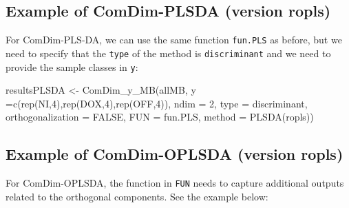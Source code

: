 \documentclass[
]{book}
\newenvironment{Shaded}{\begin{snugshade}}{\end{snugshade}}
\newcommand{\AttributeTok}[1]{\textcolor[rgb]{0.77,0.63,0.00}{#1}}
\newcommand{\ConstantTok}[1]{\textcolor[rgb]{0.00,0.00,0.00}{#1}}
\newcommand{\DecValTok}[1]{\textcolor[rgb]{0.00,0.00,0.81}{#1}}
\newcommand{\FunctionTok}[1]{\textcolor[rgb]{0.00,0.00,0.00}{#1}}
\newcommand{\NormalTok}[1]{#1}
\newcommand{\OtherTok}[1]{\textcolor[rgb]{0.56,0.35,0.01}{#1}}
\newcommand{\StringTok}[1]{\textcolor[rgb]{0.31,0.60,0.02}{#1}}
\begin{document}
\hypertarget{example-of-comdim-plsda-version-ropls}{%
\subsection{Example of ComDim-PLSDA (version ropls)}\label{example-of-comdim-plsda-version-ropls}}

For ComDim-PLS-DA, we can use the same function \texttt{fun.PLS} as before, but we need
to specify that the \texttt{type} of the method is \texttt{\textquotesingle{}discriminant\textquotesingle{}} and we need to
provide the sample classes in \texttt{y}:

\begin{Shaded}
\begin{Highlighting}[]
\NormalTok{resultsPLSDA }\OtherTok{\textless{}{-}} \FunctionTok{ComDim\_y\_MB}\NormalTok{(allMB,}
                           \AttributeTok{y =}\FunctionTok{c}\NormalTok{(}\FunctionTok{rep}\NormalTok{(}\StringTok{\textquotesingle{}NI\textquotesingle{}}\NormalTok{,}\DecValTok{4}\NormalTok{),}\FunctionTok{rep}\NormalTok{(}\StringTok{\textquotesingle{}DOX\textquotesingle{}}\NormalTok{,}\DecValTok{4}\NormalTok{),}\FunctionTok{rep}\NormalTok{(}\StringTok{\textquotesingle{}OFF\textquotesingle{}}\NormalTok{,}\DecValTok{4}\NormalTok{)),}
                           \AttributeTok{ndim =} \DecValTok{2}\NormalTok{,}
                           \AttributeTok{type =} \StringTok{\textquotesingle{}discriminant\textquotesingle{}}\NormalTok{,}
                           \AttributeTok{orthogonalization =} \ConstantTok{FALSE}\NormalTok{,}
                           \AttributeTok{FUN =}\NormalTok{ fun.PLS,}
                           \AttributeTok{method =} \StringTok{\textquotesingle{}PLSDA(ropls)\textquotesingle{}}\NormalTok{)}
\end{Highlighting}
\end{Shaded}

\hypertarget{example-of-comdim-oplsda-version-ropls}{%
\subsection{Example of ComDim-OPLSDA (version ropls)}\label{example-of-comdim-oplsda-version-ropls}}

For ComDim-OPLSDA, the function in \texttt{FUN} needs to capture additional outputs
related to the orthogonal components. See the example below:
\end{document}
